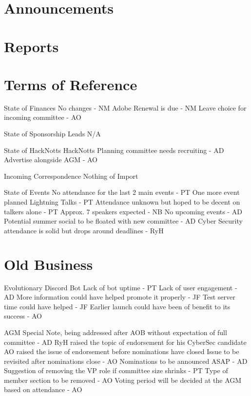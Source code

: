 \documentclass[11pt,hacksoc]{meetingmins}
\begin{document}
\maketitle

\section{Announcements}


\section{Reports}


\section{Terms of Reference}
\begin{items}
\item {State of Finances}
\subitem No changes - NM
\subitem Adobe Renewal is due - NM
\subsubitem Leave choice for incoming committee - AO
\item {State of Sponsorship Leads}
\subitem N/A
\item {State of HackNotts}
\subitem HackNotts Planning committee needs recruiting - AD
\subsubitem Advertise alongside AGM - AO
\item {Incoming Correspondence}
\subitem Nothing of Import
\item {State of Events}
\subitem No attendance for the last 2 main events - PT
\subitem One more event planned Lightning Talks - PT
\subsubitem Attendance unknown but hoped to be decent on talkers alone - PT
\subsubitem Approx. 7 speakers expected - NB
\subitem No upcoming events - AD
\subitem Potential summer social to be floated with new committee - AD
\subitem Cyber Security attendance is solid but drops around deadlines - RyH
\end{items}

\section{Old Business}
\begin{items}
\item Evolutionary Discord Bot
\subitem Lack of bot uptime - PT
\subitem Lack of user engagement - AD
\subitem More information could have helped promote it properly - JF
\subsubitem Test server time could have helped - JF
\subitem Earlier launch could have been of benefit to its success - AO
\item AGM
\subitem Special Note, being addressed after AOB without expectation of full committee - AD
\subitem RyH raised the topic of endorsement for his CyberSec candidate
\subsubitem AO raised the issue of endorsement before nominations have closed
\subsubitem Issue to be revisited after nominations close - AO
\subitem Nominations to be announced ASAP - AD
\subitem Suggestion of removing the VP role if committee size shrinks - PT
\subitem Type of member section to be removed - AO
\subitem Voting period will be decided at the AGM based on attendance - AO
\end{items}
\end{document}
